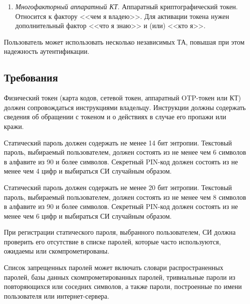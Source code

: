\begin{enumerate}
\item
{\it Многофакторный аппаратный КТ}.
Аппаратный криптографический токен.
Относится к фактору <<чем я владею>>. 
Для активации токена нужен дополнительный фактор <<что я знаю>> 
и (или) <<кто я>>.  
\end{enumerate}


Пользователь может использовать несколько независимых ТА, повышая при этом 
надежность аутентификации. 

\subsection{Требования}\label{TI.Reqs}


Физический токен (карта кодов, сетевой токен, аппаратный OTP-токен или КТ)
должен сопровождаться инструкциями владельцу. Инструкции должны содержать 
сведения об обращении с токеном и о действиях в случае его пропажи или 
кражи. 


Статический пароль должен содержать не менее 14 бит энтропии.
Текстовый пароль, выбираемый пользователем,
должен состоять из не менее чем 6 символов в алфавите
из 90 и более символов. Секретный PIN-код должен состоять из не менее
чем 4 цифр и выбираться СИ случайным образом. 
%


\label{R.TI.SP2}
Статический пароль должен содержать не менее 20 бит энтропии.
Текстовый пароль, выбираемый пользователем,
должен состоять из не менее чем 8 символов в алфавите
из 90 и более символов. Секретный PIN-код должен состоять из не менее
чем 6 цифр и выбираться СИ случайным образом. 

При регистрации статического пароля, выбранного пользователем, СИ должна 
проверить его отсутствие в списке паролей, которые часто используются,
ожидаемы или скомпрометированы.


\begin{note*}
Список запрещенных паролей может включать словари распространенных паролей,
базы данных скомпрометированных паролей, тривиальные пароли из повторяющихся
или соседних символов, а также пароли, построенные по имени пользователя или 
интернет-сервера.
\end{note*}

